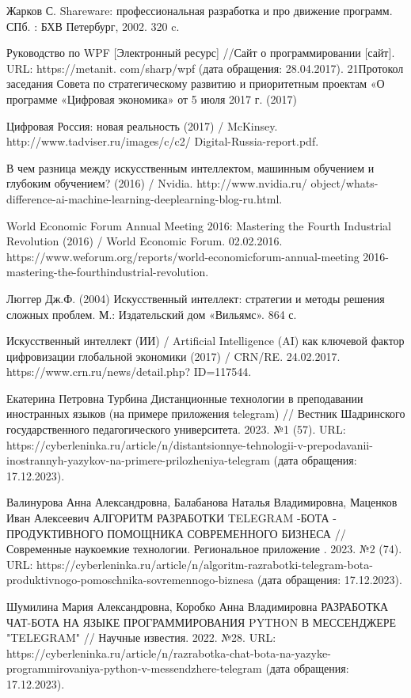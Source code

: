 \documentclass{article}
\begin{document}
 Жарков С. Shareware: профессиональная разработка и про  движение программ. СПб. : БХВ Петербург, 2002. 320 c.

 Руководство по WPF [Электронный ресурс] //Сайт о программировании [сайт]. URL: https://metanit. com/sharp/wpf (дата обращения: 28.04.2017). 
21Протокол заседания Совета по стратегическому развитию и приоритетным проектам «О программе «Цифровая экономика» от 5 июля 2017 г. (2017) 

 Цифровая Россия: новая реальность (2017) / McKinsey. http://www.tadviser.ru/images/c/c2/ Digital-Russia-report.pdf.

 В чем разница между искусственным интеллектом, машинным обучением и глубоким обучением? (2016) / Nvidia. http://www.nvidia.ru/ object/whats-difference-ai-machine-learning-deeplearning-blog-ru.html. 

World Economic Forum Annual Meeting 2016: Mastering the Fourth Industrial Revolution (2016) / World Economic Forum. 02.02.2016. https://www.weforum.org/reports/world-economicforum-annual-meeting 2016-mastering-the-fourthindustrial-revolution. 

Люггер Дж.Ф. (2004) Искусственный интеллект: стратегии и методы решения сложных проблем. М.: Издательский дом «Вильямс». 864 с.

Искусственный интеллект (ИИ) / Artificial Intelligence (AI) как ключевой фактор цифровизации глобальной экономики (2017) / CRN/RE. 24.02.2017. https://www.crn.ru/news/detail.php? ID=117544.

Екатерина Петровна Турбина Дистанционные технологии в преподавании иностранных языков (на примере приложения telegram) // Вестник Шадринского государственного педагогического университета. 2023. №1 (57). URL: https://cyberleninka.ru/article/n/distantsionnye-tehnologii-v-prepodavanii-inostrannyh-yazykov-na-primere-prilozheniya-telegram (дата обращения: 17.12.2023).

Валинурова Анна Александровна, Балабанова Наталья Владимировна, Маценков Иван Алексеевич АЛГОРИТМ РАЗРАБОТКИ TELEGRAM -БОТА - ПРОДУКТИВНОГО ПОМОЩНИКА СОВРЕМЕННОГО БИЗНЕСА // Современные наукоемкие технологии. Региональное приложение . 2023. №2 (74). URL: https://cyberleninka.ru/article/n/algoritm-razrabotki-telegram-bota-produktivnogo-pomoschnika-sovremennogo-biznesa (дата обращения: 17.12.2023).

Шумилина Мария Александровна, Коробко Анна Владимировна РАЗРАБОТКА ЧАТ-БОТА НА ЯЗЫКЕ ПРОГРАММИРОВАНИЯ PYTHON В МЕССЕНДЖЕРЕ "TELEGRAM" // Научные известия. 2022. №28. URL: https://cyberleninka.ru/article/n/razrabotka-chat-bota-na-yazyke-programmirovaniya-python-v-messendzhere-telegram (дата обращения: 17.12.2023).
\end{document}
